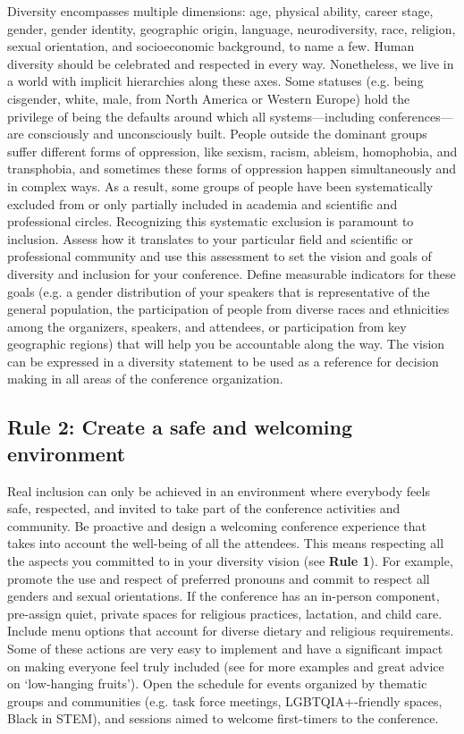 \documentclass[10pt,letterpaper]{article}
\begin{document}
Diversity encompasses multiple dimensions: age, physical ability, career stage, gender, gender identity, geographic origin, language, neurodiversity, race, religion, sexual orientation, and socioeconomic background, to name a few.
Human diversity should be celebrated and respected in every way. 
Nonetheless, we live in a world with implicit hierarchies along these axes. 
Some statuses (e.g. being cisgender, white, male, from North America or Western Europe) hold the privilege of being the defaults around which all systems—including conferences—are consciously and unconsciously built. 
People outside the dominant groups suffer different forms of oppression, like sexism, racism, ableism, homophobia, and transphobia, and sometimes these forms of oppression happen simultaneously and in complex ways.
As a result, some groups of people have been systematically excluded from or only partially included in academia and scientific and professional circles.
Recognizing this systematic exclusion is paramount to inclusion.
Assess how it translates to your particular field and scientific or professional community and use this assessment to set the vision and goals of diversity and inclusion for your conference.
Define measurable indicators for these goals (e.g. a gender distribution of your speakers that is representative of the general population, the participation of people from diverse races and ethnicities among the organizers, speakers, and attendees, or participation from key geographic regions) that will help you be accountable along the way.
The vision can be expressed in a diversity statement to be used as a reference for decision making in all areas of the conference organization. 

\subsection*{Rule 2: Create a safe and welcoming environment}
\label{rule_inclusion}

Real inclusion can only be achieved in an environment where everybody feels safe, respected, and invited to take part of the conference activities and community. Be proactive and design a welcoming conference experience that takes into account the well-being of all the attendees. This means respecting all the aspects you committed to in your diversity vision (see \textbf{Rule 1}). For example, promote the use and respect of preferred pronouns and commit to respect all genders and sexual orientations. If the conference has an in-person component, pre-assign quiet, private spaces for religious practices, lactation, and child care. Include menu options that account for diverse dietary and religious requirements.
Some of these actions are very easy to implement and have a significant impact on making everyone feel truly included (see \cite{numfocus_discover_2021} for more examples and  great advice on `low-hanging fruits').
Open the schedule for events organized by thematic groups and communities (e.g. task force meetings, LGBTQIA+-friendly spaces, Black in STEM), and sessions aimed to welcome first-timers to the conference.
\end{document}
